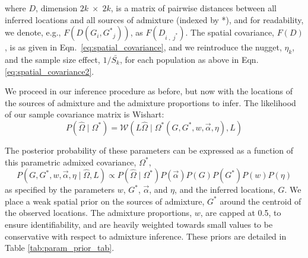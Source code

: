 \documentclass[12pt]{article}
\newcommand{\identifyadmixsource}[1]{{#1^{*}}}
\begin{document}
where $D$, dimension $2k \; \times \; 2k$, is a matrix of pairwise distances between all inferred locations and all sources of admixture (indexed by *), and for readability, we denote, e.g., $F(D(G_i,\identifyadmixsource{G}_j))$, as $F(D_{i\;,\;\identifyadmixsource{j}})$.
The spatial covariance, $F(D)$, is as given in Eqn.\ \eqref{eq:spatial_covariance}, and we reintroduce the nugget, $\eta_k$, and the sample size effect, $1/\bar{S_k}$, for each population as above in Eqn. \eqref{eq:spatial_covariance2}.

We proceed in our inference procedure as before, but now with the locations of the sources of admixture and the admixture proportions to infer.
The likelihood of our sample covariance matrix is Wishart:
\begin{equation}
\label{eq:wishart_dist_admixed}
P(\widehat{\Omega} \mid \identifyadmixsource{\Omega}) = 
	\mathcal{W}\left(L \widehat{\Omega} \mid \identifyadmixsource{\Omega} \left( G,\identifyadmixsource{G}, w,\vec{\alpha},\eta \right),L \right)
\end{equation}

The posterior probability of these parameters can be expressed as a function of this parametric admixed covariance, $\identifyadmixsource{\Omega}$,
\begin{equation}
\label{eq:admixed_post_prob}
P(G,\identifyadmixsource{G}, w,\vec{\alpha}, \eta \mid \widehat{\Omega}, L) 
	\propto  
		P(\widehat{\Omega}  \mid \identifyadmixsource{\Omega}) P(\vec{\alpha}) P(G) P(\identifyadmixsource{G}) P(w) P(\eta) 
\end{equation}
%
as specified by the parameters $w$, $\identifyadmixsource{G}$, $\vec{\alpha}$, and $\eta$, and the inferred locations, $G$.  
We place a weak spatial prior on the sources of admixture, $\identifyadmixsource{G}$ around the centroid of the observed locations. The admixture proportions, $w$, are capped at 0.5, to ensure identifiability,
and are heavily weighted towards small values to be conservative with respect to admixture inference.  
These priors are detailed in Table \ref{tab:param_prior_tab}.
\end{document}
